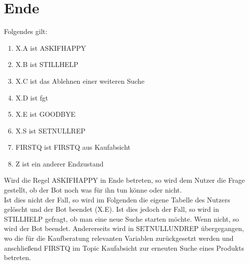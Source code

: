 \section{Ende}
\label{sec:Ende}

Folgendes gilt:

\begin{enumerate}
\item{X.A ist ASKIFHAPPY}
\item{X.B ist STILLHELP}
\item{X.C ist das Ablehnen einer weiteren Suche}
\item{\textcolor[rgb]{1,0.41,0.13}{X.D ist fgt}} %
\item{X.E ist GOODBYE}
\item{X.S ist SETNULLREP}
\item{FIRSTQ ist FIRSTQ aus Kaufabsicht}
\item{Z ist ein anderer Endzustand}
\end{enumerate}

Wird die Regel ASKIFHAPPY in Ende betreten, so wird dem Nutzer die Frage gestellt, ob der Bot noch was für ihn tun könne oder nicht.\\
Ist dies nicht der Fall, so wird im Folgenden die eigene Tabelle des Nutzers gelöscht und der Bot beendet (X.E). Ist dies jedoch der Fall, so wird in STILLHELP gefragt, ob man eine neue Suche starten möchte. Wenn nicht, so wird der Bot beendet. Andererseits wird in SETNULLUNDREP übergegangen, wo die für die Kaufberatung relevanten Variablen zurückgesetzt werden und anschließend FIRSTQ im Topic Kaufabsicht zur erneuten Suche eines Produkts betreten. 

